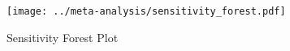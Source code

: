 \begin{figure}[p]


\texttt{[image: ../meta-analysis/sensitivity\_forest.pdf]}

\caption[Sensitivity Forest Plot]{Sensitivity Forest Plot}
\label{fig:sensitivity_forest}
\end{figure}
